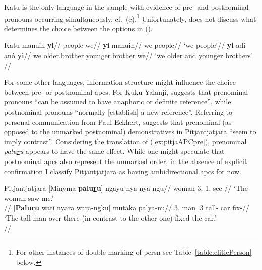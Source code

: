 \documentclass[A4paper]{article}
\begin{document}
Katu is the only language in the sample with evidence of pre- and postnominal pronouns occurring simultaneously, cf.\ (\nextx c).\footnote{For other instances of double marking of \gls{persn} see Table~\ref{table:cliticPerson} below.} Unfortunately, \citet{costello1969} does not discuss what determines the choice between the options in (\nextx).

\pex Katu
\a \begingl
\gla manuih \textbf{yi}//
\glb people we//
\endgl
\a 
\begingl
\gla \textbf{yi} manuih//
\glb we people//
\glft `we people'//
\endgl
\a
\begingl
\gla \textbf{yi} adi anó \textbf{yi}//
\glb we older.brother younger.brother we//
\glft `we older and younger brothers'\\
\citep[28, (35--37)]{costello1969}//
\endgl
\xe

For some other languages, information structure might influence the choice between pre- or postnominal \glspl{apc}.
For Kuku Yalanji, \citet[202]{patz2002} suggests %
that prenominal pronouns ``can be assumed to have anaphoric or definite reference'', while postnominal pronouns ``normally [establish] a new reference''. 
Referring to personal communication from Paul Eckhert, \citet[34]{bowe1990} suggests that prenominal (as opposed to the unmarked postnominal) demonstratives in Pitjantjatjara ``seem to imply contrast''. Considering the translation of (\ref{ex:pitjaAPCpre}), prenominal \emph{palu\underline{r}u} appears to have the same effect. While one might speculate that postnominal \glspl{apc} also represent the unmarked order, in the absence of explicit confirmation I classify Pitjantjatjara as having ambidirectional \glspl{apc} for now. %

\pex Pitjantjatjara
\a
\begingl
\gla {}[Minyma \textbf{palu\underline{r}u}] ngayu-nya nya-ngu//
\glb \phantom{[}woman 3\Sg{}.\Nom{} 1\Sg{}.\Acc{} see-\Pst{}//
\glft `The woman saw me.' \\{\citep[31, (110)]{bowe1990}}//
\endgl
\a \label{ex:pitjaAPCpre}
\begingl
\gla {}[\textbf{Palu\underline{r}u} wati nyara wa\underline{r}a-ngku] mutaka palya-nu//
\glb \phantom{[}3\Sg{}.\Nom{} man \Dem.3 tall-\Erg{} car fix-\Pst{}//
\glft `The tall man over there (in contrast to the other one) fixed the car.' \\{\citep[after][34, (114)]{bowe1990}}//
\endgl
\xe
\end{document}
